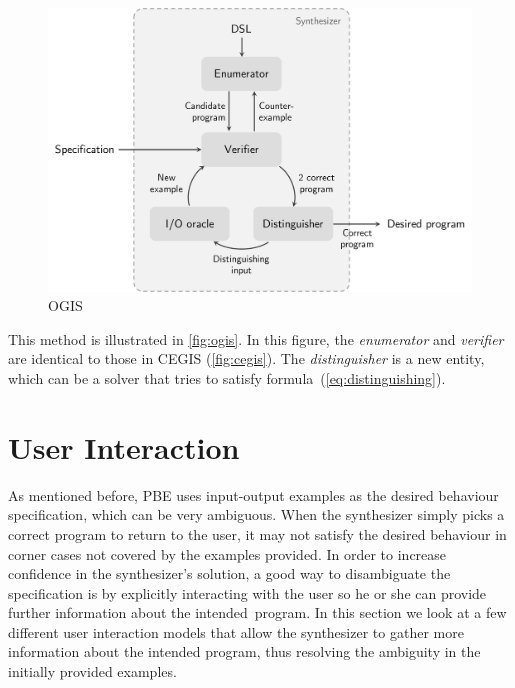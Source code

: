 \begin{figure}
    \centering
    \includegraphics[scale=.35]{pictures/ogis.pdf}
    \caption{\ac{OGIS}}
    \label{fig:ogis}
\end{figure}

This method is illustrated in \autoref{fig:ogis}. In this figure, the \textit{enumerator} and \textit{verifier} are identical to those in \ac{CEGIS} (\autoref{fig:cegis}). The \textit{distinguisher} is a new entity, which can be a solver that tries to satisfy formula~(\ref{eq:distinguishing}).


\section{User Interaction} \label{sec:rel-user-interaction}

As mentioned before, \ac{PBE} uses input-output examples as the desired behaviour specification, which can be very ambiguous. When the synthesizer simply picks a correct program to return to the user, it may not satisfy the desired behaviour in corner cases not covered by the examples provided.
In order to increase confidence in the synthesizer's solution, a good way to disambiguate the specification is by explicitly interacting with the user so he or she can provide further information about the intended~program.
In this section we look at a few different user interaction models that allow the synthesizer to gather more information about the intended program, thus resolving the ambiguity in the initially provided examples.

